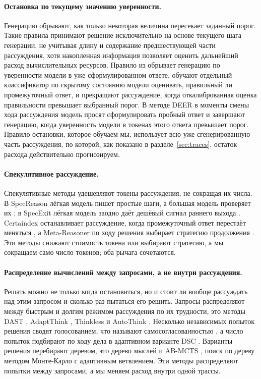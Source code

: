 \documentclass[11pt]{article}
\begin{document}
\paragraph{Остановка по текущему значению уверенности.} Генерацию обрывают, как только некоторая величина пересекает заданный порог. Такие правила принимают решение исключительно на основе текущего шага генерации, не учитывая длину и содержание предшествующей части рассуждения, хотя накопленная информация позволяет оценить дальнейший расход вычислительных ресурсов. Правило из \citet{jurayj2025final} обрывает генерацию по уверенности модели в уже сформулированном ответе. \citet{zhang2025knowwhenright} обучают отдельный классификатор по скрытому состоянию модели оценивать, правильный ли промежуточный ответ, и прекращают рассуждение, когда откалиброванная оценка правильности превышает выбранный порог. В методе DEER \citep{yang2025deer} в моменты смены хода рассуждения модель просят сформулировать пробный ответ и завершают генерацию, когда уверенность модели в токенах этого ответа превышает порог. Правило остановки, которое обучаем мы, использует всю уже сгенерированную часть рассуждения, по которой, как показано в разделе~\ref{sec:traces}, остаток расхода действительно прогнозируем.

\paragraph{Спекулятивное рассуждение.} Спекулятивные методы удешевляют токены рассуждения, не сокращая их числа. В SpecReason лёгкая модель пишет простые шаги, а большая модель проверяет их \citep{pan2025specreason}; в SpecExit лёгкая модель заодно даёт дешёвый сигнал раннего выхода \citep{yang2025specexit}. Certaindex останавливает рассуждение, когда промежуточный ответ перестаёт меняться \citep{fu2024certaindex}, а Meta-Reasoner по ходу решения выбирает стратегию продолжения \citep{sui2025metareasoner}. Эти методы снижают стоимость токена или выбирают стратегию, а мы сокращаем само число токенов; оба рычага сочетаются.

\paragraph{Распределение вычислений между запросами, а не внутри рассуждения.} Решать можно не только когда остановиться, но и стоит ли вообще рассуждать над этим запросом и сколько раз пытаться его решить. Запросы распределяют между быстрым и долгим режимом рассуждения по их трудности, это методы DAST \citep{shen2025dast}, AdaptThink \citep{zhang2025adaptthink}, Thinkless \citep{fang2025thinkless} и AutoThink \citep{tu2025autothink}. Несколько независимых попыток решения сводят голосованием, что называют самосогласованностью \citep{wang2023selfconsistency}, а число попыток подбирают по ходу дела в адаптивном варианте DSC \citep{wang2025dsc}. Варианты решения перебирают деревом, это дерево мыслей \citep{yao2023tot} и AB-MCTS \citep{inoue2025abmcts}, поиск по дереву методом Монте-Карло с адаптивным ветвлением. Эти методы распределяют попытки между запросами, а мы меняем расход внутри одной трассы.
\end{document}
